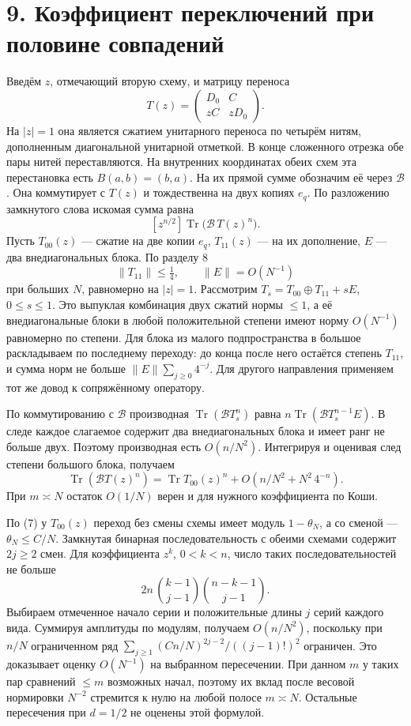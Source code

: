 \documentclass[11pt,a4paper]{article}
\newcommand{\Tr}{\operatorname{Tr}}
\newcommand{\sect}[1]{\section*{\sffamily\color{ink}#1}}
\begin{document}
\newpage
\sect{9. Коэффициент переключений при половине совпадений}
Введём \(z\), отмечающий вторую схему, и матрицу переноса
\[
       T(z)=\begin{pmatrix}D_0&C\\ zC&zD_0\end{pmatrix}.
\]
На \(|z|=1\) она является сжатием унитарного переноса по четырём нитям, дополненным диагональной унитарной отметкой. В конце сложенного отрезка обе пары нитей переставляются. На внутренних координатах обеих схем эта перестановка есть \(B(a,b)=(b,a)\). На их прямой сумме обозначим её через \(\mathcal B\). Она коммутирует с \(T(z)\) и тождественна на двух копиях \(e_q\). По разложению замкнутого слова искомая сумма равна
\[
                     [z^{n/2}]\Tr\big(\mathcal B\,T(z)^n\big).
\]
Пусть \(T_{00}(z)\) — сжатие на две копии \(e_q\), \(T_{11}(z)\) — на их дополнение, \(E\) — два внедиагональных блока. По разделу 8
\[
                \|T_{11}\|\le \tfrac14,\qquad \|E\|=O(N^{-1})
\]
при больших \(N\), равномерно на \(|z|=1\).
Рассмотрим \(T_s=T_{00}\oplus T_{11}+sE\), \(0\le s\le1\). Это выпуклая комбинация двух сжатий нормы \(\le1\), а её внедиагональные блоки в любой положительной степени имеют норму \(O(N^{-1})\) равномерно по степени. Для блока из малого подпространства в большое раскладываем по последнему переходу: до конца после него остаётся степень \(T_{11}\), и сумма норм не больше \(\|E\|\sum_{j\ge0}4^{-j}\). Для другого направления применяем тот же довод к сопряжённому оператору.

По коммутированию с \(\mathcal B\) производная \(\Tr(\mathcal B T_s^n)\) равна
\(n\Tr(\mathcal B T_s^{n-1}E)\). В следе каждое слагаемое содержит два внедиагональных блока и имеет ранг не больше двух. Поэтому производная есть \(O(n/N^2)\). Интегрируя и оценивая след степени большого блока, получаем
\[
       \Tr(\mathcal B T(z)^n)=\Tr T_{00}(z)^n+
                   O(n/N^2+N^2\,4^{-n}) .
\]
При \(m\asymp N\) остаток \(O(1/N)\) верен и для нужного коэффициента по Коши.

По (7) у \(T_{00}(z)\) переход без смены схемы имеет модуль \(1-\theta_N\), а со сменой — \(\theta_N\le C/N\). Замкнутая бинарная последовательность с обеими схемами содержит \(2j\ge2\) смен. Для коэффициента \(z^k\), \(0<k<n\), число таких последовательностей не больше
\[
       2n\,\binom{k-1}{j-1}\binom{n-k-1}{j-1}.
\]
Выбираем отмеченное начало серии и положительные длины \(j\) серий каждого вида. Суммируя амплитуды по модулям, получаем \(O(n/N^2)\), поскольку при \(n/N\) ограниченном ряд
\(\sum_{j\ge1}(C n/N)^{2j-2}/((j-1)!)^2\) ограничен. Это доказывает оценку \(O(N^{-1})\) на выбранном пересечении. При данном \(m\) у таких пар сравнений \(\le m\) возможных начал, поэтому их вклад после весовой нормировки \(N^{-2}\) стремится к нулю на любой полосе \(m\asymp N\). Остальные пересечения при \(d=1/2\) не оценены этой формулой.
\end{document}
